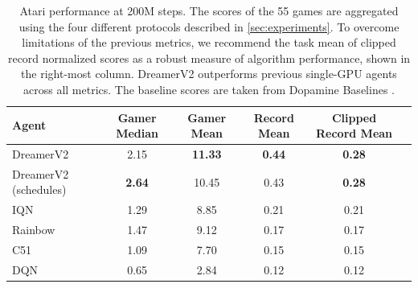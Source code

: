 \begin{table}[b]
\centering
\small
\begin{tabular}{lccccc}
\toprule
\textbf{Agent} & \textbf{Gamer Median} & \textbf{Gamer Mean} & \textbf{Record Mean} & \textbf{Clipped Record Mean} \\
\midrule
DreamerV2 & 2.15 & \textbf{11.33} & \textbf{0.44} & \textbf{0.28} \\
DreamerV2 (schedules) & \textbf{2.64} & 10.45 & 0.43 & \textbf{0.28} \\
IQN & 1.29 & \hphantom{0}8.85 & 0.21 & 0.21 \\
Rainbow & 1.47 & \hphantom{0}9.12 & 0.17 & 0.17 \\
C51 & 1.09 & \hphantom{0}7.70 & 0.15 & 0.15 \\
DQN & 0.65 & \hphantom{0}2.84 & 0.12 & 0.12 \\
\bottomrule
\end{tabular}
\caption{Atari performance at 200M steps. The scores of the 55 games are aggregated using the four different protocols described in \cref{sec:experiments}. To overcome limitations of the previous metrics, we recommend the task mean of clipped record normalized scores as a robust measure of algorithm performance, shown in the right-most column. DreamerV2 outperforms previous single-GPU agents across all metrics. The baseline scores are taken from Dopamine Baselines \citep{castro2018dopamine}.}
\label{tab:agg}
\end{table}
